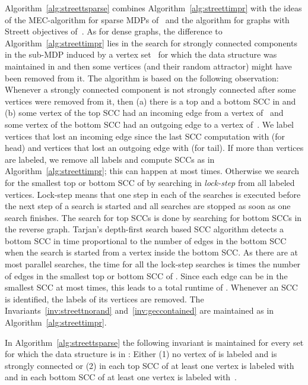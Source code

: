 \documentclass[11pt,letterpaper]{article}
\newcommand{\lu}{\textup{(}}
\newcommand{\ru}{\textup{)}\xspace}
\newcommand{\upbr}[1]{\lu #1\ru}
\begin{document}
Algorithm~\ref{alg:streettsparse} combines Algorithm~\ref{alg:streettimpr}
with the ideas of the MEC-algorithm for sparse MDPs of~\cite{ChatterjeeH14} and 
the algorithm for graphs with Streett objectives of~\cite{HenzingerT96}.
As for dense graphs, the difference to
Algorithm~\ref{alg:streettimpr} lies in the search for strongly connected 
components in the sub-MDP  induced by a vertex set~ for which 
the data structure was maintained in  and then some vertices (and their 
random attractor) might have been removed from it. The algorithm is based 
on the following observation: Whenever a strongly connected component 
is not strongly connected after some vertices  were removed from it,
then \upbr{a} there is a top and a bottom SCC in  and 
\upbr{b} some vertex of the top SCC had an incoming edge from a vertex of~
and some vertex of the bottom SCC had an outgoing edge to a vertex of~.
We label vertices that lost an incoming edge since the last SCC computation 
with  (for head) and vertices that lost an outgoing edge with  (for tail).
If more than  vertices are labeled, we remove all labels and 
compute SCCs as in Algorithm~\ref{alg:streettimpr}; this can happen at most 
 times. Otherwise we search for the smallest top or bottom SCC 
of  by searching in \emph{lock-step} from all labeled vertices.
Lock-step means that one step in each of the searches is executed before 
the next step of a search is started and all searches are stopped as soon as 
one search finishes. The search for top SCCs is done by 
searching for bottom SCCs in the reverse graph. Tarjan's depth-first search 
based SCC algorithm detects a bottom SCC in time proportional to the number 
of edges in the bottom SCC when the search is started from a vertex inside
the bottom SCC. As there are at most  parallel searches,
the time for all the lock-step searches is  times the 
number of edges in the smallest top or bottom SCC of . Since 
each edge can be in the smallest SCC at most  times, this leads to 
a total runtime of .
Whenever an SCC is identified, the labels of its vertices are removed. The 
Invariants~\ref{inv:streettnorand} and~\ref{inv:geccontained} are maintained
as in Algorithm~\ref{alg:streettimpr}.

\begin{lemma}\label{lem:streettsparselabel}
	In Algorithm~\ref{alg:streettsparse} the following invariant is maintained
	for every set  for which the data structure  is in : 
	Either \upbr{1} no vertex of  is labeled and  is strongly connected or 
	\upbr{2} in each top SCC of  at least one vertex is labeled with~
	and in each bottom SCC of  at least one vertex is labeled with~.
\end{lemma}
\end{document}
